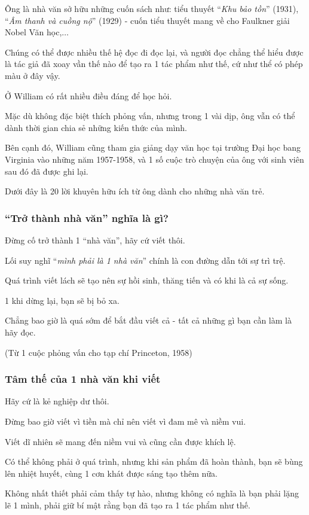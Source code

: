 \documentclass{article}
\begin{document}
Ông là nhà văn sở hữu những cuốn sách như: tiểu thuyết ``\textit{Khu bảo tồn}'' (1931), ``\textit{Âm thanh và cuồng nộ}'' (1929) - cuốn tiểu thuyết mang về cho Faulkner giải Nobel Văn học,$\ldots$

Chúng có thể được nhiều thế hệ đọc đi đọc lại, và người đọc chẳng thể hiểu được là tác giả đã xoay vần thế nào để tạo ra 1 tác phẩm như thế, cứ như thể có phép màu ở đây vậy.

Ở William có rất nhiều điều đáng để học hỏi.

Mặc dù không đặc biệt thích phỏng vấn, nhưng trong 1 vài dịp, ông vẫn có thể dành thời gian chia sẻ những kiến thức của mình.

Bên cạnh đó, William cũng tham gia giảng dạy văn học tại trường Đại học bang Virginia vào những năm 1957-1958, và 1 số cuộc trò chuyện của ông với sinh viên sau đó đã được ghi lại.

Dưới đây là 20 lời khuyên hữu ích từ ông dành cho những nhà văn trẻ.

\subsubsection{``Trở thành nhà văn'' nghĩa là gì?}
Đừng cố trở thành 1 ``nhà văn'', hãy cứ viết thôi.

Lối suy nghĩ ``\textit{mình phải là 1 nhà văn}'' chính là con đường dẫn tới sự trì trệ.

Quá trình viết lách sẽ tạo nên sự hồi sinh, thăng tiến và có khi là cả sự sống.

1 khi dừng lại, bạn sẽ bị bỏ xa.

Chẳng bao giờ là quá sớm để bắt đầu viết cả - tất cả những gì bạn cần làm là hãy đọc.

(Từ 1 cuộc phỏng vấn cho tạp chí Princeton, 1958)

\subsubsection{Tâm thế của 1 nhà văn khi viết}
Hãy cứ là kẻ nghiệp dư thôi.

Đừng bao giờ viết vì tiền mà chỉ nên viết vì đam mê và niềm vui.

Viết dĩ nhiên sẽ mang đến niềm vui và cũng cần được khích lệ.

Có thể không phải ở quá trình, nhưng khi sản phẩm đã hoàn thành, bạn sẽ bùng lên nhiệt huyết, cùng 1 cơn khát được sáng tạo thêm nữa.

Không nhất thiết phải cảm thấy tự hào, nhưng không có nghĩa là bạn phải lặng lẽ 1 mình, phải giữ bí mật rằng bạn đã tạo ra 1 tác phẩm như thế.
\end{document}
